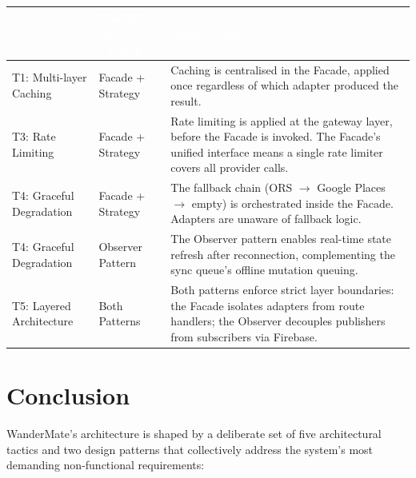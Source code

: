 \documentclass[12pt, a4paper]{article}
\newcommand{\thcell}[1]{\textcolor{white}{\textbf{\small #1}}}
\begin{document}
\begin{longtable}{L{3.5cm} L{3.5cm} L{6.5cm}}
\toprule
{}
\thcell{Tactic} & \thcell{Enabled By Pattern} & \thcell{Relationship} \\
\midrule
\endhead
\bottomrule
\endfoot

T1: Multi-layer Caching & Facade + Strategy & Caching is centralised in the Facade, applied once regardless of which adapter produced the result. \\

T3: Rate Limiting & Facade + Strategy & Rate limiting is applied at the gateway layer, before the Facade is invoked. The Facade's unified interface means a single rate limiter covers all provider calls. \\

T4: Graceful Degradation & Facade + Strategy & The fallback chain (ORS $\to$ Google Places $\to$ empty) is orchestrated inside the Facade. Adapters are unaware of fallback logic. \\

T4: Graceful Degradation & Observer Pattern & The Observer pattern enables real-time state refresh after reconnection, complementing the sync queue's offline mutation queuing. \\

T5: Layered Architecture & Both Patterns & Both patterns enforce strict layer boundaries: the Facade isolates adapters from route handlers; the Observer decouples publishers from subscribers via Firebase. \\

\end{longtable}

\section{Conclusion}

WanderMate's architecture is shaped by a deliberate set of five architectural tactics and two design patterns that collectively address the system's most demanding non-functional requirements:
\end{document}

